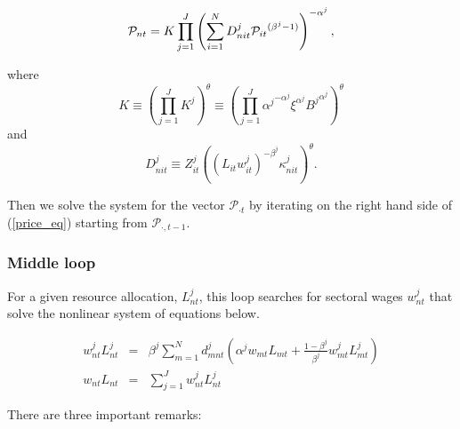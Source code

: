 \documentclass[12pt]{article}
\begin{document}
\begin{equation}
\mathcal{P}_{nt} = K \prod_{j = 1}^J \left(\sum_{i = 1}^N D_{nit}^j {%
\mathcal{P}_{it}}^{(\beta^j - 1)}\right)^{-\alpha^j},  \label{price_eq}
\end{equation}

where 
\begin{equation*}
K \equiv \left(\prod_{j = 1}^J K^j\right)^\theta \equiv \left(\prod_{j =
1}^J {\alpha^j}^{- \alpha^j} \xi^{\alpha^j} {B^j}^{\alpha^j} \right)^\theta
\end{equation*}
and 
\begin{equation*}
D_{nit}^j \equiv Z_{it}^j {\left((L_{it}w_{it}^j)^{- \beta^j}
\kappa_{nit}^j\right)}^{\theta}.
\end{equation*}

Then we solve the system for the vector $\mathcal{P}_{\cdot t}$ by iterating
on the right hand side of (\ref{price_eq}) starting from $\mathcal{P}_{\cdot
,t-1}$.

\subsubsection{Middle loop}

For a given resource allocation, $L_{nt}^j$, this loop searches for sectoral
wages $w_{nt}^j$ that solve the nonlinear system of equations below.

\begin{eqnarray}
w_{nt}^j L_{nt}^j &=& \beta^j \sum_{m = 1}^N d_{mnt}^j \left( \alpha^j
w_{mt} L_{mt} + \frac{1 - \beta^j}{\beta^j} w_{mt}^j L_{mt}^j\right) \\
w_{nt} L_{nt} &=& \sum_{j = 1}^J w_{nt}^j L_{nt}^j
\end{eqnarray}

There are three important remarks:
\end{document}
